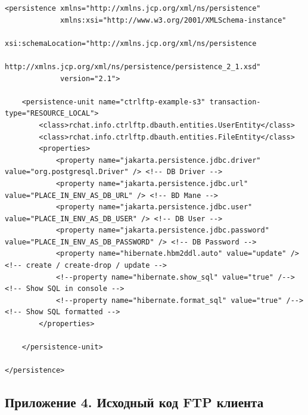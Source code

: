 \documentclass[a4paper,14pt]{extarticle}
\begin{document}
\begin{verbatim}
<persistence xmlns="http://xmlns.jcp.org/xml/ns/persistence"
             xmlns:xsi="http://www.w3.org/2001/XMLSchema-instance"
             xsi:schemaLocation="http://xmlns.jcp.org/xml/ns/persistence
             http://xmlns.jcp.org/xml/ns/persistence/persistence_2_1.xsd"
             version="2.1">

    <persistence-unit name="ctrlftp-example-s3" transaction-type="RESOURCE_LOCAL">
        <class>rchat.info.ctrlftp.dbauth.entities.UserEntity</class>
        <class>rchat.info.ctrlftp.dbauth.entities.FileEntity</class>
        <properties>
            <property name="jakarta.persistence.jdbc.driver" value="org.postgresql.Driver" /> <!-- DB Driver -->
            <property name="jakarta.persistence.jdbc.url" value="PLACE_IN_ENV_AS_DB_URL" /> <!-- BD Mane -->
            <property name="jakarta.persistence.jdbc.user" value="PLACE_IN_ENV_AS_DB_USER" /> <!-- DB User -->
            <property name="jakarta.persistence.jdbc.password" value="PLACE_IN_ENV_AS_DB_PASSWORD" /> <!-- DB Password -->
            <property name="hibernate.hbm2ddl.auto" value="update" /> <!-- create / create-drop / update -->
            <!--property name="hibernate.show_sql" value="true" /--> <!-- Show SQL in console -->
            <!--property name="hibernate.format_sql" value="true" /--> <!-- Show SQL formatted -->
        </properties>

    </persistence-unit>

</persistence>
\end{verbatim}
\subsection{Приложение 4. Исходный код FTP клиента}
\end{document}
